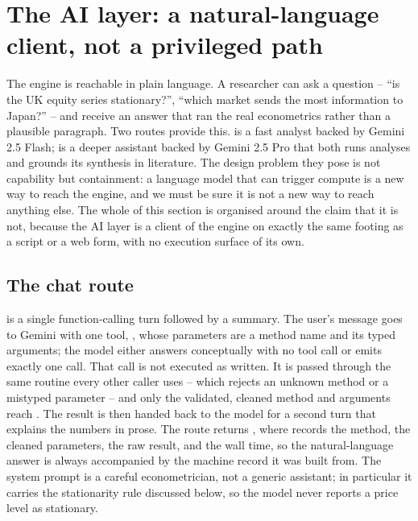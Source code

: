 \section{The AI layer: a natural-language client, not a privileged path}
\label{sec:ai-layer}

The engine is reachable in plain language. A researcher can ask a question -- ``is the
UK equity series stationary?'', ``which market sends the most information to Japan?''
-- and receive an answer that ran the real econometrics rather than a plausible
paragraph. Two routes provide this.  is a fast analyst backed by
Gemini 2.5 Flash;  is a deeper assistant backed by Gemini 2.5 Pro
that both runs analyses and grounds its synthesis in literature. The design problem
they pose is not capability but containment: a language model that can trigger compute
is a new way to reach the engine, and we must be sure it is not a new way to reach
anything else. The whole of this section is organised around the claim that it is not,
because the AI layer is a client of the engine on exactly the same footing as a script
or a web form, with no execution surface of its own.

\subsection{The chat route}
\label{sec:chat-route}

 is a single function-calling turn followed by a summary. The user's
message goes to Gemini with one tool, , whose parameters are a
method name and its typed arguments; the model either answers conceptually with no tool
call or emits exactly one call. That call is not executed as written. It is passed
through the same  routine every other caller uses -- which rejects an
unknown method or a mistyped parameter -- and only the validated, cleaned method and
arguments reach . The result is then handed back to the model for
a second turn that explains the numbers in prose. The route returns
, where  records the method, the cleaned parameters, the
raw result, and the wall time, so the natural-language answer is always accompanied by
the machine record it was built from. The system prompt is a careful econometrician,
not a generic assistant; in particular it carries the stationarity rule discussed
below, so the model never reports a price level as stationary.


